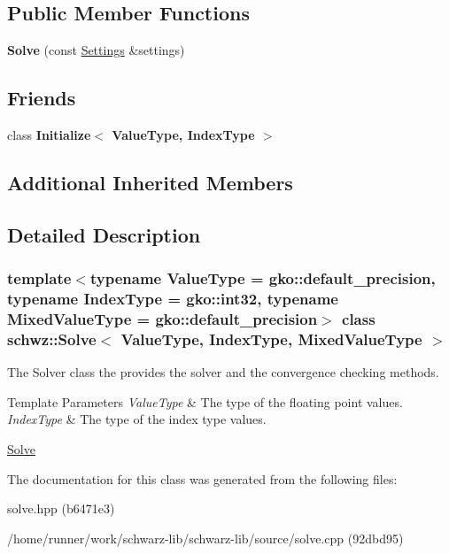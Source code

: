 \subsection*{Public Member Functions}
\begin{DoxyCompactItemize}
\item 
\mbox{\label{classschwz_1_1Solve_a667e6b9674ec54bb95152c8f263f1467}} 
{\bfseries Solve} (const \hyperlink{structschwz_1_1Settings}{Settings} \&settings)
\end{DoxyCompactItemize}
\subsection*{Friends}
\begin{DoxyCompactItemize}
\item 
\mbox{\label{classschwz_1_1Solve_a7044b349fe5363eeace2d1a56b38f650}} 
class {\bfseries Initialize$<$ Value\+Type, Index\+Type $>$}
\end{DoxyCompactItemize}
\subsection*{Additional Inherited Members}


\subsection{Detailed Description}
\subsubsection*{template$<$typename Value\+Type = gko\+::default\+\_\+precision, typename Index\+Type = gko\+::int32, typename Mixed\+Value\+Type = gko\+::default\+\_\+precision$>$\newline
class schwz\+::\+Solve$<$ Value\+Type, Index\+Type, Mixed\+Value\+Type $>$}

The Solver class the provides the solver and the convergence checking methods. 


\begin{DoxyTemplParams}{Template Parameters}
{\em Value\+Type} & The type of the floating point values. \\
\hline
{\em Index\+Type} & The type of the index type values.\\
\hline
\end{DoxyTemplParams}
\hyperlink{group__solve}{Solve} 

The documentation for this class was generated from the following files\+:\begin{DoxyCompactItemize}
\item 
solve.\+hpp (b6471e3)\item 
/home/runner/work/schwarz-\/lib/schwarz-\/lib/source/solve.\+cpp (92dbd95)\end{DoxyCompactItemize}
